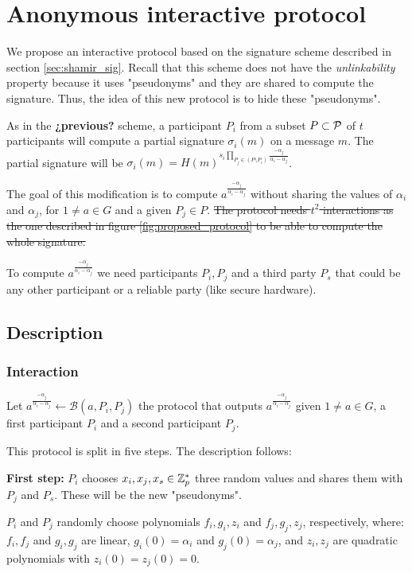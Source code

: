 \section{Anonymous interactive protocol}

We propose an interactive protocol based on the signature scheme described in section \ref{sec:shamir_sig}. Recall that this scheme does not have the \textit{unlinkability} property because it uses "pseudonyms" and they are shared to compute the signature. Thus, the idea of this new protocol is to hide these "pseudonyms".

As in the \textbf{¿previous?} scheme, a participant $P_i$ from a subset $P \subset {\mathcal P}$ of $t$ participants will compute a partial signature $\sigma_i (m)$ on a message $m$. The partial signature will be $\sigma_i (m) = H(m)^{s_i \prod_{P_j \in (P \setminus P_i)} \frac{-\alpha_j}{\alpha_i - \alpha_j}}$.

The goal of this modification is to compute $a^\frac{-\alpha_j}{\alpha_i - \alpha_j}$ without sharing the values of $\alpha_i$ and $\alpha_j$, for $1 \neq a \in G$ and a given $P_j \in P$. \sout{The protocol needs $t^2$ interactions as the one described in figure \ref{fig:proposed_protocol} to be able to compute the whole signature.}

To compute $a^\frac{-\alpha_j}{\alpha_i - \alpha_j}$ we need participants $P_i,P_j$ and a third party $P_s$ that could be any other participant or a reliable party (like secure hardware).

\subsection{Description}
\subsubsection*{Interaction}
Let $a^{\frac{-\alpha_j}{\alpha_i - \alpha_j}} \leftarrow \mathcal{B}(a,P_i,P_j)$ the protocol that outputs $a^{\frac{-\alpha_j}{\alpha_i - \alpha_j}}$ given $1 \neq a \in G$, a first participant $P_i$ and a second participant $P_j$.

This protocol is split in five steps. The description follows:

\textbf{First step:} $P_i$ chooses $x_i, x_j, x_s \in {\mathbb Z}^*_p$ three random values and shares them with $P_j$ and $P_s$. These will be the new "pseudonyms".

$P_i$ and $P_j$ randomly choose polynomials $f_i, g_i, z_i$ and $f_j, g_j, z_j$, respectively, where: $f_i,f_j$ and $g_i,g_j$ are linear, $g_i(0) = \alpha_i$ and $g_j(0) = \alpha_j$, and $z_i,z_j$ are quadratic polynomials with $z_i(0) = z_j(0) = 0$.

